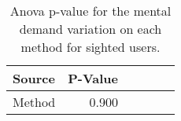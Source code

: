 
\begin{table}[!htb]
\centering
\caption{Anova p-value for the mental demand variation on each method for sighted users.}
\label{tab:blocanova_md_var_sight}
\begin{tabular}{lrrrrr}
\toprule
Source & P-Value \\
\midrule
Method &   0.900 \\
\bottomrule
\end{tabular}
\end{table}

